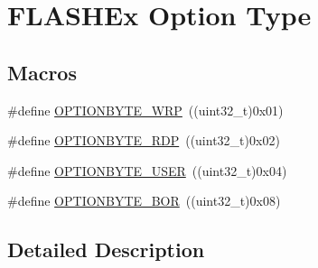 \hypertarget{group___f_l_a_s_h_ex___option___type}{\section{F\-L\-A\-S\-H\-Ex Option Type}
\label{group___f_l_a_s_h_ex___option___type}
}
\subsection*{Macros}
\begin{DoxyCompactItemize}
\item 
\#define \hyperlink{group___f_l_a_s_h_ex___option___type_ga48712a166ea192ddcda0f2653679f9ec}{O\-P\-T\-I\-O\-N\-B\-Y\-T\-E\-\_\-\-W\-R\-P}~((uint32\-\_\-t)0x01)
\item 
\#define \hyperlink{group___f_l_a_s_h_ex___option___type_ga8f0bdb21ef13bae39d5d8b6619e2df06}{O\-P\-T\-I\-O\-N\-B\-Y\-T\-E\-\_\-\-R\-D\-P}~((uint32\-\_\-t)0x02)
\item 
\#define \hyperlink{group___f_l_a_s_h_ex___option___type_gac7d843e666e15c79688a1914e8ffe7a5}{O\-P\-T\-I\-O\-N\-B\-Y\-T\-E\-\_\-\-U\-S\-E\-R}~((uint32\-\_\-t)0x04)
\item 
\#define \hyperlink{group___f_l_a_s_h_ex___option___type_gaf4063216c8386467d187663190936c07}{O\-P\-T\-I\-O\-N\-B\-Y\-T\-E\-\_\-\-B\-O\-R}~((uint32\-\_\-t)0x08)
\end{DoxyCompactItemize}


\subsection{Detailed Description}


